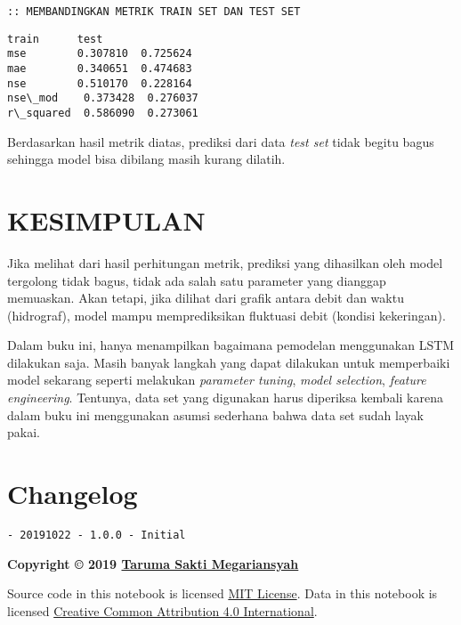 \documentclass[11pt]{article}
\makeatletter
\newcommand{\boxspacing}{\kern\kvtcb@left@rule\kern\kvtcb@boxsep}
\newcommand{\prompt}[4]{
        \ttfamily\llap{{\color{#2}[#3]:\hspace{3pt}#4}}\vspace{-\baselineskip}
    }
\let\oldsection\section
\renewcommand\section{\clearpage\oldsection}
\makeatother
\begin{document}
    \begin{Verbatim}[commandchars=\\\{\}]
:: MEMBANDINGKAN METRIK TRAIN SET DAN TEST SET
    \end{Verbatim}

            \begin{tcolorbox}[breakable, size=fbox, boxrule=.5pt, pad at break*=1mm, opacityfill=0]
\prompt{Out}{outcolor}{0}{\boxspacing}
\begin{Verbatim}[commandchars=\\\{\}]
              train      test
mse        0.307810  0.725624
mae        0.340651  0.474683
nse        0.510170  0.228164
nse\_mod    0.373428  0.276037
r\_squared  0.586090  0.273061
\end{Verbatim}
\end{tcolorbox}
        
    Berdasarkan hasil metrik diatas, prediksi dari data \emph{test set}
tidak begitu bagus sehingga model bisa dibilang masih kurang dilatih.

    \hypertarget{kesimpulan}{%
\section{KESIMPULAN}\label{kesimpulan}}

    Jika melihat dari hasil perhitungan metrik, prediksi yang dihasilkan
oleh model tergolong tidak bagus, tidak ada salah satu parameter yang
dianggap memuaskan. Akan tetapi, jika dilihat dari grafik antara debit
dan waktu (hidrograf), model mampu memprediksikan fluktuasi debit
(kondisi kekeringan).

Dalam buku ini, hanya menampilkan bagaimana pemodelan menggunakan LSTM
dilakukan saja. Masih banyak langkah yang dapat dilakukan untuk
memperbaiki model sekarang seperti melakukan \emph{parameter tuning},
\emph{model selection}, \emph{feature engineering}. Tentunya, data set
yang digunakan harus diperiksa kembali karena dalam buku ini menggunakan
asumsi sederhana bahwa data set sudah layak pakai.

    \hypertarget{changelog}{%
\section{Changelog}\label{changelog}}

\begin{verbatim}
- 20191022 - 1.0.0 - Initial
\end{verbatim}

\textbf{Copyright © 2019 \href{https://taruma.github.io}{Taruma Sakti
Megariansyah}}

Source code in this notebook is licensed
\href{https://github.com/taruma/vivaldi/blob/master/LICENSE}{MIT
License}. Data in this notebook is licensed
\href{https://creativecommons.org/licenses/by/4.0/}{Creative Common
Attribution 4.0 International}.


    
    
    
\end{document}
